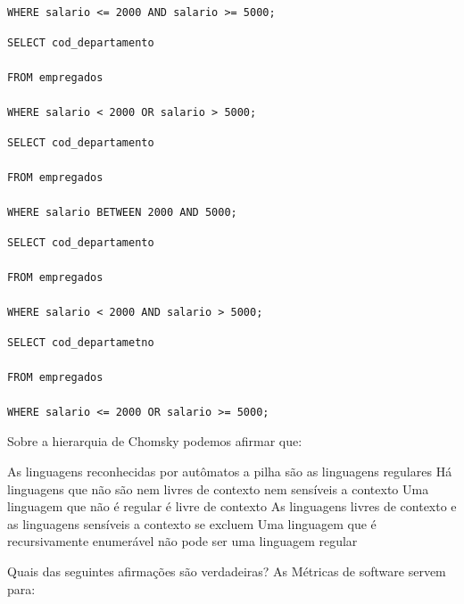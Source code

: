 \documentclass[12pt, addpoints]{exam}
\begin{document}
\begin{questions}
\begin{choices}
\begin{verbatim}
WHERE salario <= 2000 AND salario >= 5000;

\end{verbatim}


\choice \begin{verbatim}SELECT cod_departamento

FROM empregados

WHERE salario < 2000 OR salario > 5000;

\end{verbatim}


\choice \begin{verbatim}SELECT cod_departamento

FROM empregados

WHERE salario BETWEEN 2000 AND 5000;

\end{verbatim}


\choice \begin{verbatim}SELECT cod_departamento

FROM empregados

WHERE salario < 2000 AND salario > 5000;

\end{verbatim}


\choice \begin{verbatim}SELECT cod_departametno

FROM empregados

WHERE salario <= 2000 OR salario >= 5000;

\end{verbatim}


\end{choices}

\question

Sobre a hierarquia de Chomsky podemos afirmar que:
\begin{choices}
\choice As linguagens reconhecidas por autômatos a pilha são as linguagens regulares
\choice Há linguagens que não são nem livres de contexto nem sensíveis a contexto
\choice Uma linguagem que não é regular é livre de contexto
\choice As linguagens livres de contexto e as linguagens sensíveis a contexto se excluem
\choice Uma linguagem que é recursivamente enumerável não pode ser uma linguagem regular
\end{choices}

\question

Quais das seguintes afirmações são verdadeiras? As Métricas de software servem para:




\end{questions}
\end{document}
